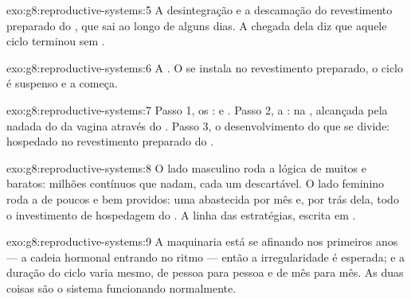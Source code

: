 \begin{solution}{exo:g8:reproductive-systems:5}
A desintegração e a descamação do revestimento preparado do , que
sai ao longo de alguns dias. A chegada dela diz que aquele ciclo
terminou sem .
\end{solution}

\begin{solution}{exo:g8:reproductive-systems:6}
A . O  se instala no revestimento preparado, o ciclo é
suspenso e a  começa.
\end{solution}

\begin{solution}{exo:g8:reproductive-systems:7}
Passo 1, os :  e . Passo 2, a : na
, alcançada pela nadada do  da vagina
através do . Passo 3, o desenvolvimento do  que se divide:
hospedado no revestimento preparado do .
\end{solution}

\begin{solution}{exo:g8:reproductive-systems:8}
O lado masculino roda a lógica de muitos e baratos: milhões contínuos
que nadam, cada um descartável. O lado feminino roda a de poucos e bem
providos: uma  abastecida por mês e, por trás dela, todo o
investimento de hospedagem do . A linha das estratégias, escrita
em .
\end{solution}

\begin{solution}{exo:g8:reproductive-systems:9}
A maquinaria está se afinando nos primeiros anos --- a cadeia hormonal
entrando no ritmo --- então a irregularidade é esperada; e a duração do
ciclo varia mesmo, de pessoa para pessoa e de mês para mês. As duas
coisas são o sistema funcionando normalmente.
\end{solution}

